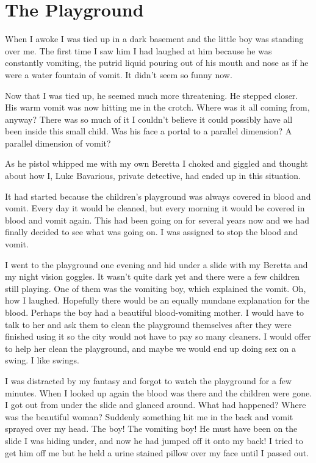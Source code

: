 \chapter{The Playground}



When I awoke I was tied up in a dark basement and the little boy
was standing over me. The first time I saw him I had laughed at him
because he was constantly vomiting, the putrid liquid pouring out
of his mouth and nose as if he were a water fountain of vomit. It
didn't seem so funny now.



Now that I was tied up, he seemed much more threatening. He stepped
closer. His warm vomit was now hitting me in the crotch. Where was
it all coming from, anyway? There was so much of it I
couldn't believe it could possibly have all been inside this
small child. Was his face a portal to a parallel dimension? A
parallel dimension of vomit?



As he pistol whipped me with my own Beretta I choked and giggled
and thought about how I, Luke Bavarious, private detective, had
ended up in this situation.



It had started because the children's playground was always
covered in blood and vomit. Every day it would be cleaned, but
every morning it would be covered in blood and vomit again. This
had been going on for several years now and we had finally decided
to see what was going on. I was assigned to stop the blood and
vomit.



I went to the playground one evening and hid under a slide with my
Beretta and my night vision goggles. It wasn't quite dark yet
and there were a few children still playing. One of them was the
vomiting boy, which explained the vomit. Oh, how I laughed.
Hopefully there would be an equally mundane explanation for the
blood. Perhaps the boy had a beautiful blood-vomiting mother. I
would have to talk to her and ask them to clean the playground
themselves after they were finished using it so the city would not
have to pay so many cleaners. I would offer to help her clean the
playground, and maybe we would end up doing sex on a swing. I like
swings.



I was distracted by my fantasy and forgot to watch the playground
for a few minutes. When I looked up again the blood was there and
the children were gone. I got out from under the slide and glanced
around. What had happened? Where was the beautiful woman? Suddenly
something hit me in the back and vomit sprayed over my head. The
boy! The vomiting boy! He must have been on the slide I was hiding
under, and now he had jumped off it onto my back! I tried to get
him off me but he held a urine stained pillow over my face until I
passed out.



